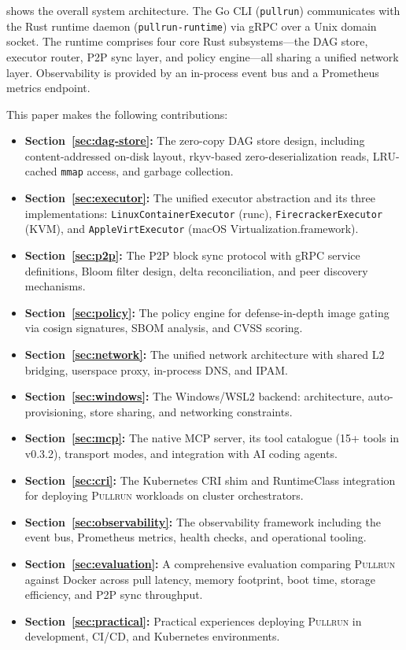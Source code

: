 \documentclass[11pt,a4paper]{article}
\newcommand{\pullrun}{\textsc{Pullrun}}
\newcommand{\mmap}{\texttt{mmap}}
\begin{document}
 shows the overall system architecture. The Go CLI (\texttt{pullrun}) communicates with the Rust runtime daemon (\texttt{pullrun-runtime}) via gRPC over a Unix domain socket. The runtime comprises four core Rust subsystems---the DAG store, executor router, P2P sync layer, and policy engine---all sharing a unified network layer. Observability is provided by an in-process event bus and a Prometheus metrics endpoint.

This paper makes the following contributions:

\begin{itemize}[leftmargin=*]
    \item \textbf{Section~\ref{sec:dag-store}:} The zero-copy DAG store design, including content-addressed on-disk layout, rkyv-based zero-deserialization reads, LRU-cached \mmap{} access, and garbage collection.
    \item \textbf{Section~\ref{sec:executor}:} The unified executor abstraction and its three implementations: \texttt{LinuxContainerExecutor} (runc), \texttt{FirecrackerExecutor} (KVM), and \texttt{AppleVirtExecutor} (macOS Virtualization.framework).
    \item \textbf{Section~\ref{sec:p2p}:} The P2P block sync protocol with gRPC service definitions, Bloom filter design, delta reconciliation, and peer discovery mechanisms.
    \item \textbf{Section~\ref{sec:policy}:} The policy engine for defense-in-depth image gating via cosign signatures, SBOM analysis, and CVSS scoring.
    \item \textbf{Section~\ref{sec:network}:} The unified network architecture with shared L2 bridging, userspace proxy, in-process DNS, and IPAM.
    \item \textbf{Section~\ref{sec:windows}:} The Windows/WSL2 backend: architecture, auto-provisioning, store sharing, and networking constraints.
    \item \textbf{Section~\ref{sec:mcp}:} The native MCP server, its tool catalogue (15+ tools in v0.3.2), transport modes, and integration with AI coding agents.
    \item \textbf{Section~\ref{sec:cri}:} The Kubernetes CRI shim and RuntimeClass integration for deploying \pullrun{} workloads on cluster orchestrators.
    \item \textbf{Section~\ref{sec:observability}:} The observability framework including the event bus, Prometheus metrics, health checks, and operational tooling.
    \item \textbf{Section~\ref{sec:evaluation}:} A comprehensive evaluation comparing \pullrun{} against Docker across pull latency, memory footprint, boot time, storage efficiency, and P2P sync throughput.
    \item \textbf{Section~\ref{sec:practical}:} Practical experiences deploying \pullrun{} in development, CI/CD, and Kubernetes environments.
\end{itemize}
\end{document}
